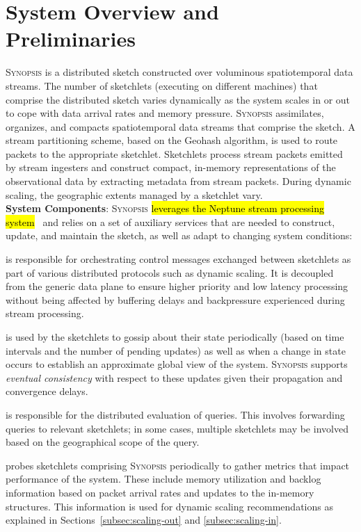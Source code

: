 \documentclass[9pt,journal,compsoc]{IEEEtran}
\begin{document}
\section{System Overview and Preliminaries}
\label{sec:system}
\textsc{Synopsis} is a distributed sketch constructed over voluminous spatiotemporal data streams.
The number of sketchlets (executing on different machines) that comprise the distributed sketch varies dynamically as the system scales in or out to cope with data arrival rates and memory pressure.
\textsc{Synopsis} assimilates, organizes, and compacts spatiotemporal data streams that comprise the sketch.
A stream partitioning scheme, based on the Geohash algorithm, is used to route packets to the appropriate sketchlet.
Sketchlets process stream packets emitted by stream ingesters and construct compact, in-memory representations of the observational data by extracting metadata from stream packets.
During dynamic scaling, the geographic extents managed by a sketchlet vary.
%
\vspace{0.7em}\\
%
\textbf{System Components}:
\textsc{Synopsis} \hl{leverages the Neptune stream processing system}~\cite{buddhika2016neptune, buddhika2017online} and relies on a set of auxiliary services that are needed to construct, update, and maintain the sketch, as well as adapt to changing system conditions:
\begin{description}[leftmargin=*]
\item[Control plane] is responsible for orchestrating control messages exchanged between sketchlets as part of various distributed protocols such as dynamic scaling.
    It is decoupled from the generic data plane to ensure higher priority and low latency processing without being affected by buffering delays and backpressure experienced during stream processing.

\item[Gossip subsystem] is used by the sketchlets to gossip about their state periodically (based on time intervals and the number of pending updates) as well as when a change in state occurs to establish an approximate global view of the system. \textsc{Synopsis} supports \emph{eventual consistency} with respect to these updates given their propagation and convergence delays.

\item[Querying subsystem] is responsible for the distributed evaluation of queries.
    This involves forwarding queries to relevant sketchlets; in some cases, multiple sketchlets may be involved based on the geographical scope of the query.

\item[Monitoring subsystem] probes sketchlets comprising \textsc{Synopsis} periodically to gather metrics that impact performance of the system.
    These include memory utilization and backlog information based on packet arrival rates and updates to the in-memory structures.
    This information is used for dynamic scaling recommendations as explained in Sections~\ref{subsec:scaling-out} and \ref{subsec:scaling-in}.
\end{description}
\end{document}
